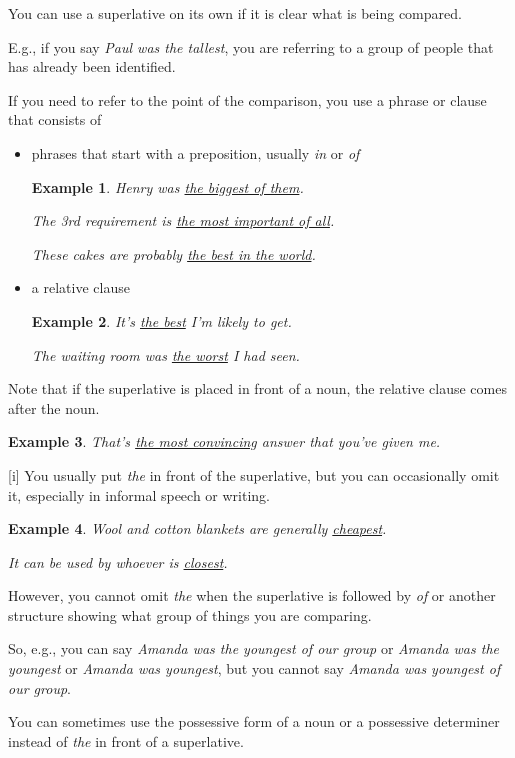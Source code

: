 \documentclass[oneside]{book}
\numberwithin{equation}{section}
\newtheorem{example}{Example}[section]
\begin{document}
%
\noindent{} You can use a superlative on its own if it is clear what is being compared.

E.g., if you say \textit{Paul was the tallest}, you are referring to a group of people that has already been identified.

%
If you need to refer to the point of the comparison, you use a phrase or clause that consists of
\begin{itemize}
    \item phrases that start with a preposition, usually \textit{in} or \textit{of}
    \begin{example}
        Henry was \underline{the biggest of them}.
        
        The 3rd requirement is \underline{the most important of all}.
        
        These cakes are probably \underline{the best in the world}.
    \end{example}
    \item a relative clause
    \begin{example}
        It's \underline{the best} I'm likely to get.
        
        The waiting room was \underline{the worst} I had seen.
    \end{example}
\end{itemize}
Note that if the superlative is placed in front of a noun, the relative clause comes after the noun.
\begin{example}
    That's \underline{the most convincing} answer that you've given me.
\end{example}
%
\noindent{} [i] You usually put \textit{the} in front of the superlative, but you can occasionally omit it, especially in informal speech or writing.
\begin{example}
    Wool and cotton blankets are generally \underline{cheapest}.
    
    It can be used by whoever is \underline{closest}.
\end{example}
However, you cannot omit \textit{the} when the superlative is followed by \textit{of} or another structure showing what group of things you are comparing.

So, e.g., you can say \textit{Amanda was the youngest of our group} or \textit{Amanda was the youngest} or \textit{Amanda was youngest}, but you cannot say \textit{Amanda was youngest of our group}.

%
You can sometimes use the possessive form of a noun or a possessive determiner instead of \textit{the} in front of a superlative.
\end{document}
